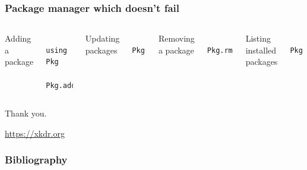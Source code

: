\documentclass[aspectratio=169]{beamer} %
\begin{document}
\begin{frame}[fragile]
  \frametitle{Package manager which doesn't fail}
  \vspace{0.5cm}  
  \begin{columns}[t]
  Adding a package
  \begin{verbatim}
  using Pkg
  Pkg.add("ExamplePackage")
  \end{verbatim}
  Updating packages
  \begin{verbatim}
  Pkg.update()
  \end{verbatim}
  Removing a package
  \begin{verbatim}
  Pkg.rm("ExamplePackage")
  \end{verbatim}
  Listing installed packages
  \begin{verbatim}
  Pkg.status()
  \end{verbatim}
  \end{columns}
\end{frame} 

\begin{frame}
  \hfill {\LARGE Thank you}.

  \vfill
  \vfill

  \hfill \url{https://xkdr.org}
\end{frame}

\begin{frame}[allowframebreaks]
  \frametitle{Bibliography}
  \renewcommand*{\bibfont}{\scriptsize}\printbibliography
\end{frame}
\end{document}

